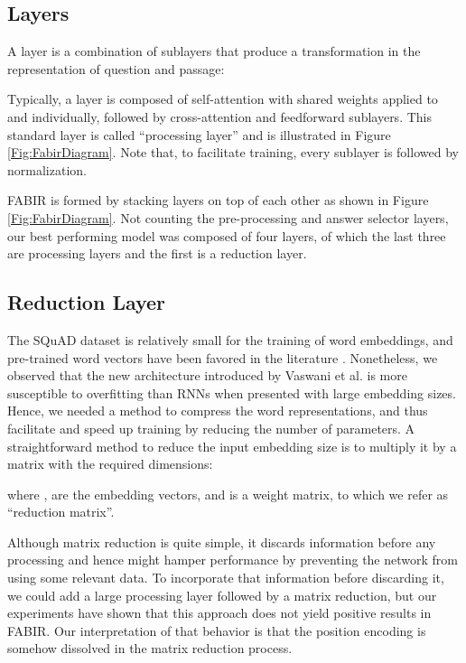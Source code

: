 \documentclass[conference, letterpaper, 10pt]{IEEEtran}
\begin{document}
\subsection{Layers}
A layer  is a combination of sublayers that produce a transformation in the representation of question and passage:



Typically, a layer is composed of self-attention with shared weights applied to  and  individually, followed by cross-attention and feedforward sublayers. 
This standard layer is called {``}processing layer{''} and is illustrated in Figure \ref{Fig:FabirDiagram}.
Note that, to facilitate training, every sublayer is followed by normalization.

FABIR is formed by stacking layers on top of each other as shown in Figure \ref{Fig:FabirDiagram}. Not counting the pre-processing and answer selector layers, our best performing model was composed of four layers, of which the last three are processing layers and the first is a reduction layer.

\subsection{Reduction Layer}
The SQuAD dataset is relatively small for the training of word embeddings, and pre-trained word vectors have been favored in the literature \cite{Seo2016}. Nonetheless, we observed that the new architecture introduced by Vaswani et al. \cite{Vaswani} is more susceptible to overfitting than RNNs when presented with large embedding sizes. Hence, we needed a method to compress the word representations, and thus facilitate and speed up training by reducing the number of parameters.
A straightforward method to reduce the input embedding size is to multiply it by a matrix with the required dimensions:

where ,  are the embedding vectors, and  is a weight matrix, to which we refer as {``}reduction matrix{''}. 

Although matrix reduction is quite simple, it discards information before any processing and hence might hamper performance by preventing the network from using some relevant data.
To incorporate that information before discarding it, we could add a large processing layer followed by a matrix reduction, but our experiments have shown that this approach does not yield positive results in FABIR.
Our interpretation of that behavior is that the position encoding is somehow dissolved in the matrix reduction process. 
\end{document}
